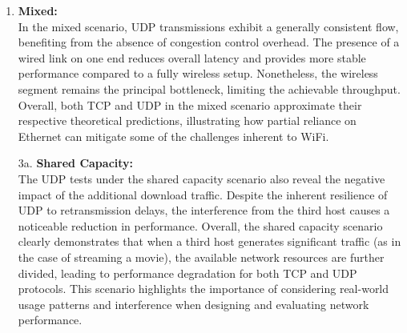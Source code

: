 \begin{enumerate}
            \item \textbf{Mixed:} \\
                In the mixed scenario, UDP transmissions exhibit a generally consistent flow, benefiting from the absence of congestion control overhead. The presence of a wired link on one end reduces overall latency and provides more stable performance compared to a fully wireless setup. Nonetheless, the wireless segment remains the principal bottleneck, limiting the achievable throughput. Overall, both TCP and UDP in the mixed scenario approximate their respective theoretical predictions, illustrating how partial reliance on Ethernet can mitigate some of the challenges inherent to WiFi.
                
            \item[3a.] \textbf{Shared Capacity:} \\
                The UDP tests under the shared capacity scenario also reveal the negative impact of the additional download traffic.
                Despite the inherent resilience of UDP to retransmission delays, the interference from the third host causes a noticeable reduction in performance.  Overall, the shared capacity scenario clearly demonstrates that when a third host generates significant traffic (as in the case of streaming a movie), the available network resources are further divided, leading to performance degradation for both TCP and UDP protocols.  This scenario highlights the importance of considering real-world usage patterns and interference when designing and evaluating network performance.

        \end{enumerate}

